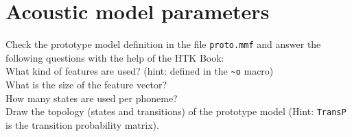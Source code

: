 \documentclass[onecolumn]{article}
\begin{document}
\section*{Acoustic model parameters}
Check the prototype model definition in the file \verb|proto.mmf| and answer the following questions with the help of the HTK Book:\\
What kind of features are used? (hint: defined in the \verb|~o| macro)\\[7mm]
What is the size of the feature vector?\\[7mm]
How many states are used per phoneme?\\[7mm]
Draw the topology (states and transitions) of the prototype model (Hint: \verb|TransP| is the transition probability matrix).

\clearpage
\end{document}

